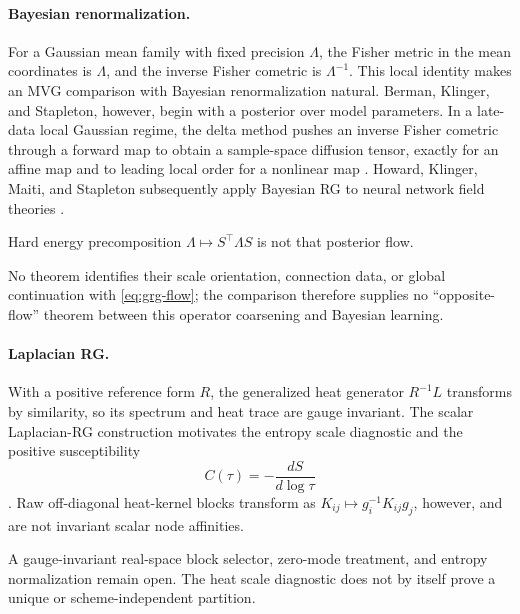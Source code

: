 \paragraph{Bayesian renormalization.}
For a Gaussian mean family with fixed precision \(\Lambda\), the Fisher
metric in the mean coordinates is \(\Lambda\), and the inverse Fisher
cometric is \(\Lambda^{-1}\).  This local identity makes an MVG comparison
with Bayesian renormalization natural.  Berman, Klinger, and Stapleton,
however, begin with a posterior over model parameters. In a late-data local
Gaussian regime, the delta method pushes an inverse Fisher cometric through a
forward map to obtain a sample-space diffusion tensor, exactly for an affine
map and to leading local order for a nonlinear map
\citep{BermanKlingerStapleton2023,BermanKlinger2024Inverse}. Howard,
Klinger, Maiti, and Stapleton subsequently apply Bayesian RG to neural
network field theories \citep{HowardKlingerMaitiStapleton2025}.

Hard energy precomposition \(\Lambda\mapsto S^\top\Lambda S\) is not that
posterior flow. 

No theorem identifies their scale orientation,
connection data, or global continuation with \eqref{eq:grg-flow}; the
comparison therefore supplies no ``opposite-flow'' theorem between this
operator coarsening and Bayesian learning. 

\paragraph{Laplacian RG.}
With a positive reference form \(R\), the generalized heat generator
\(R^{-1}L\) transforms by similarity, so its spectrum and heat trace are
gauge invariant.  The scalar Laplacian-RG construction motivates the
entropy scale diagnostic and the positive susceptibility
\begin{equation}
C(\tau)=-\frac{dS}{d\log\tau}
\label{eq:grg-heat-capacity}
\end{equation}
\citep{villegas2023laplacian}.  Raw off-diagonal heat-kernel blocks transform
as \(K_{ij}\mapsto g_i^{-1}K_{ij}g_j\), however, and are not invariant scalar
node affinities. 

A gauge-invariant real-space block selector, zero-mode
treatment, and entropy normalization remain open.  The heat scale diagnostic
does not by itself prove a unique or scheme-independent partition.

